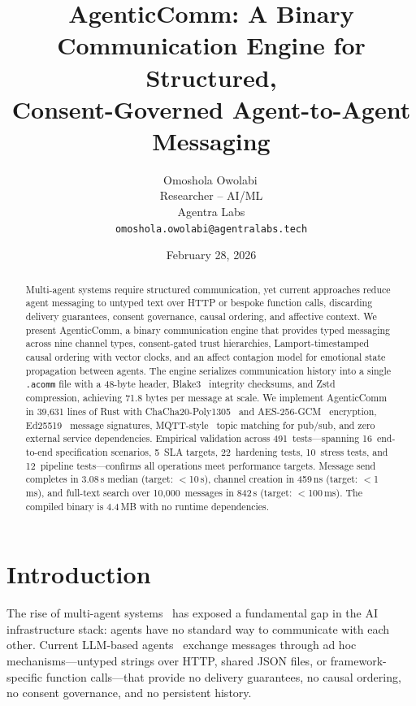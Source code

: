 \documentclass[10pt, twocolumn]{article}
\title{\textbf{AgenticComm: A Binary Communication Engine for Structured,\\Consent-Governed Agent-to-Agent Messaging}}
\author{Omoshola Owolabi\,\orcidlink{0009-0006-4089-0732}\\Researcher -- AI/ML\\Agentra Labs\\\texttt{omoshola.owolabi@agentralabs.tech}}
\date{February 28, 2026}
\begin{document}
\maketitle
\thispagestyle{fancy}

\begin{abstract}
Multi-agent systems require structured communication, yet current approaches reduce agent messaging to untyped text over HTTP or bespoke function calls, discarding delivery guarantees, consent governance, causal ordering, and affective context. We present AgenticComm, a binary communication engine that provides typed messaging across nine channel types, consent-gated trust hierarchies, Lamport-timestamped causal ordering with vector clocks, and an affect contagion model for emotional state propagation between agents. The engine serializes communication history into a single \texttt{.acomm} file with a 48-byte header, Blake3~\cite{blake3_2020} integrity checksums, and Zstd~\cite{zstd2016} compression, achieving 71.8 bytes per message at scale. We implement AgenticComm in 39{,}631 lines of Rust with ChaCha20-Poly1305~\cite{bernstein2012chacha} and AES-256-GCM~\cite{aes_gcm_2007} encryption, Ed25519~\cite{ed25519_2012} message signatures, MQTT-style~\cite{mqtt2019} topic matching for pub/sub, and zero external service dependencies. Empirical validation across 491~tests---spanning 16~end-to-end specification scenarios, 5~SLA targets, 22~hardening tests, 10~stress tests, and 12~pipeline tests---confirms all operations meet performance targets. Message send completes in 3.08\,\textmu{}s median (target: $<$10\,\textmu{}s), channel creation in 459\,ns (target: $<$1\,ms), and full-text search over 10{,}000~messages in 842\,\textmu{}s (target: $<$100\,ms). The compiled binary is 4.4\,MB with no runtime dependencies.
\end{abstract}

\section{Introduction}
\label{sec:intro}

The rise of multi-agent systems~\cite{xi2023rise, park2023generative, hong2023metagpt} has exposed a fundamental gap in the AI infrastructure stack: agents have no standard way to communicate with each other. Current LLM-based agents~\cite{autogen2023, crewai2024, langchain2023} exchange messages through ad hoc mechanisms---untyped strings over HTTP, shared JSON files, or framework-specific function calls---that provide no delivery guarantees, no causal ordering, no consent governance, and no persistent history.
\end{document}
